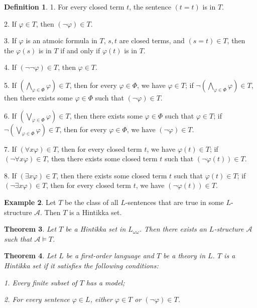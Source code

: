 \documentclass[12pt, reqno]{amsart}
\newtheorem{theorem}{Theorem}[section]
\theoremstyle{definition}
\newtheorem{definition}[theorem]{Definition}
\newtheorem{example}[theorem]{Example}
\theoremstyle{remark}
\numberwithin{equation}{section}
\begin{document}
{\begin{definition}
    1. For every closed term $t$, the sentence $(t = t)$ is in $T$.

    2. If $\varphi \in T$, then $(\neg \varphi) \in T$.

    3. If $\varphi$ is an atmoic formula in $T$, $s,t$ are closed terms, and $(s = t) \in T$, then the $\varphi(s)$ is in $T$ if and only if $\varphi(t)$ is in $T$.

    4. If $(\neg \neg \varphi) \in T$, then $\varphi \in T$.

    5. If $(\bigwedge_{\varphi\in \Phi} \varphi) \in T$, then for every $\varphi \in \Phi$, we have $\varphi \in T$; if $\neg(\bigwedge_{\varphi\in \Phi} \varphi) \in T$, then there exists some $\varphi \in \Phi$ such that $(\neg \varphi) \in T$.

    6. If $(\bigvee_{\varphi\in \Phi} \varphi) \in T$, then there exists some $\varphi \in \Phi$ such that $\varphi \in T$; if $\neg(\bigvee_{\varphi\in \Phi} \varphi) \in T$, then for every $\varphi \in \Phi$, we have $(\neg \varphi) \in T$.

    7. If $(\forall x \varphi) \in T$, then for every closed term $t$, we have $\varphi(t) \in T$; if $(\neg \forall x \varphi) \in T$, then there exists some closed term $t$ such that $(\neg \varphi(t)) \in T$.

    8. If $(\exists x \varphi) \in T$, then there exists some closed term $t$ such that $\varphi(t) \in T$; if $(\neg \exists x \varphi) \in T$, then for every closed term $t$, we have $(\neg \varphi(t)) \in T$.
\end{definition}

\begin{example}
    Let $T$ be the class of all $L$-sentences that are true in some $L$-structure $\mathcal{A}$. Then $T$ is a Hintikka set.
\end{example}

\begin{theorem}
    Let $T$ be a Hintikka set in $L_{\omega \omega}$. Then there exists an $L$-structure $\mathcal{A}$ such that $\mathcal{A} \models T$.
\end{theorem}

\begin{theorem}
    Let $L$ be a first-order language and $T$ be a theory in $L$. $T$ is a Hintikka set if it satisfies the following conditions:

    1. Every finite subset of $T$ has a model;

    2. For every sentence $\varphi \in L$, either $\varphi \in T$ or $(\neg \varphi) \in T$.
    

\end{theorem}}
\end{document}
